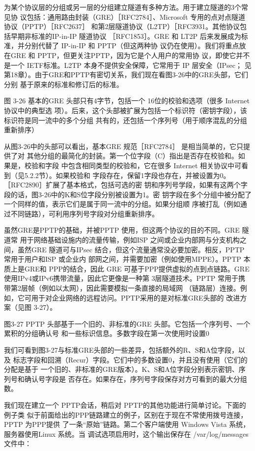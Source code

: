 为某个协议层的分组或另一层的分组建立隧道有多种方法。用于建立隧道的3个常见协
议包括：通用路由封装（GRE）［RFC2784］、Microsoft 专用的点对点隧道协议（PPTP）［RFC2637］
和第2层隧道协议（L2TP）［RFC3931。其他协议包括早期非标准的IP-in-IP 隧道协议
［RFC1853］。GRE 和 LT2P 后来发展成为标准，并分别代替了 IP-in-IP 和 PPTP（但这两种协
议仍在使用）。我们将重点放在GRE 和 PPTP，但更关注PPTP，因为它是个人用户的常用协
议，即使它并不是一个 IETF标准。L2TP 本身不提供安全保障，它常用于 IP 层安全（IPsec；
见第18章）。由于GRE和PPTP有密切关系，我们现在看图3-26中的GRE头部，它们分别
基于原来的标准和修订后的标准。


图 3-26
基本的GRE 头部只有4字节，包括一个 16位的校验和选项（很多 Internet 协议中的典型选
项）。后来，这个头部被扩展为包括一个标识符（密钥字段），该标识符是同一流中的多个分组
共有的，还包括一个序列号（用于顺序混乱的分组重新排序）

从图3-26中的头部可以看出，基本GRE 规范［RFC2784］ 是相当简单的，它只提供了对
其他分组的最简化的封装。第一个位字段（C）指出是否存在校验和。如果是，校验和字段
中包含相同类型的校验和，它在很多 Internet 相关协议中可看到（见5.2.2节）。如果校验和
字段存在，保留1字段也存在，并被设置为0。［RFC2890］扩展了基本格式，包括可选的密
钥和序列号学段，如果有这两个字段的话，图3-26中的K和S位字段分别被设置为1。密
钥字段在多个分组中被分配了一个同样的值，表示它们是属于同一流中的分组。如果分组顺
序被打乱（例如通过不同链路），可利用序列号字段对分组重新排序。

虽然GRE是PPTP的基础，并被PPTP 使用，但这两个协议的目的不同。GRE 隧道常
用于网络基础设施内的流量传输，例如ISP 之间或企业内部网与分支机构之间，虽然GRE
隧道可与IPsec 结合，但这个流量通常没必要加密。相反，PPTP 常用于用户和ISP 或企业内
部网之间，并需要加密（例如使用MPPE）。PPTP 本质上是GRE和 PPP的结合，因此 GRE
可基于PPP提供虚拟的点到点链路。GRE使用IPv4或IPv6携带流量，因此它更像是一种第
3层隧道技术。PPTP 常用于携带第2层帧（例如以太网），因此需要模拟一条直接的局域网
（链路层）连接。例如，它可用于对企业网络的远程访问。PPTP采用的是对标准GRE头部的
改进方案（见图 3-27）。

图3-27 PPTP 头部基于一个旧的、非标准的GRE 头部。它包括一个序列号、一个累积的分组确认号
和一些标识信息。多数字段在第一次使用时设置0

我们可看到图3-27与标准GRE头部的一些差异，包括额外的R、S和A位字段，以及
标志字段和回溯（Recur）字段。它们中的多数设置0，并且没有使用（它们的分配是基于
一个旧的、非标准的GRE版本）。K、S和A位字段分别表示密钥、序列号和确认号字段是
否存在。如果存在，序列号字段保存对方可看到的最大分组数。

我们现在建立一个 PPTP会话，稍后对 PPTP的其他功能进行简单讨论。下面的例子类
似于前面给出的PPP链路建立的例子，区别在于现在不常使用拨号连接，PPTP 为PPP提供
了一条“原始”链路。第二个客户端使用 Windows Vista 系统，服务器使用Linux 系统。当
调试选项启用时，这个输出保存在 /var/log/messages 文件中：

